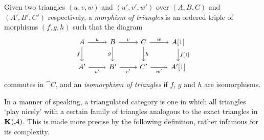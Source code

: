 \begin{definition}
  Given two triangles $(u, v, w)$ and $(u', v', w')$ over $(A, B, C)$
  and $(A', B', C')$ respectively, a \emph{morphism of triangles} is
  an ordered triple of morphisms $(f, g, h)$ such that the diagram
  \[
    \begin{tikzcd}
      A & B & C & {A[1]} \\
      {A'} & B' & C' & {A'[1]}
      \arrow["u", from=1-1, to=1-2]
      \arrow["f"', from=1-1, to=2-1]
      \arrow["v", from=1-2, to=1-3]
      \arrow["g"', from=1-2, to=2-2]
      \arrow["w", from=1-3, to=1-4]
      \arrow["h", from=1-3, to=2-3]
      \arrow["{f[1]}", from=1-4, to=2-4]
      \arrow["{u'}"', from=2-1, to=2-2]
      \arrow["{v'}"', from=2-2, to=2-3]
      \arrow["{w'}"', from=2-3, to=2-4]
    \end{tikzcd}
  \]
  commutes in $\cat{C}$, and an \emph{isomorphism of triangles} if
  $f$, $g$ and $h$ are isomorphisms.
\end{definition}

In a manner of speaking, a triangulated category is one in which all
triangles `play nicely' with a certain family of triangles analogous
to the exact triangles in ${\mathbf{K}}^{{}}({\mathcal{A}})$.
This is made more precise by the following definition, rather
infamous for its complexity.

